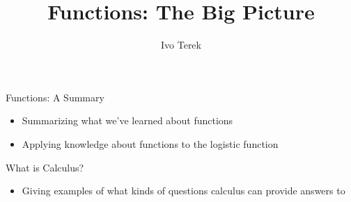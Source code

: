 \documentclass{ximera}
\author{Ivo Terek}
\title{Functions: The Big Picture}
\begin{document}
\begin{abstract}
\end{abstract}
\maketitle


\begin{objectives}

\item Functions: A Summary
\begin{itemize}
	\item Summarizing what we've learned about functions
        \item Applying knowledge about functions to the logistic function 
\end{itemize}

\item What is Calculus?

  \begin{itemize}
  	\item Giving examples of what kinds of questions calculus can provide answers to
  \end{itemize}

\end{objectives}
\end{document}
